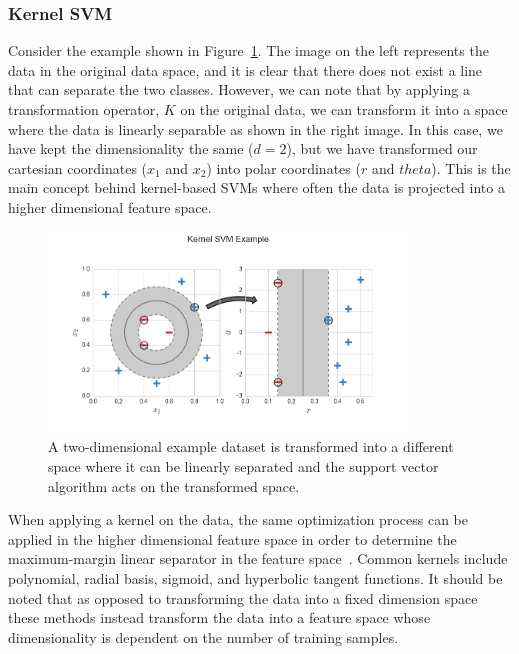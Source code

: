\subsubsection{Kernel SVM}

Consider the example shown in Figure~\ref{fig:kernelSvmExample}.
%
The image on the left represents the data in the original data space, and it is clear that there does not exist a line that can separate the two classes.
%
However, we can note that by applying a transformation operator, $K$ on the original data, we can transform it into a space where the data is linearly separable as shown in the right image.
%
In this case, we have kept the dimensionality the same ($d=2$), but we have transformed our cartesian coordinates ($x_1$ and $x_2$) into polar coordinates ($r$ and $theta$).
%
This is the main concept behind kernel-based SVMs where often the data is projected into a higher dimensional feature space.

\begin{figure}[!ht]
  \centering
  \includegraphics[width=0.85\textwidth]{figs/chap3/kernelSvmExample}
  \caption[Kernel Support Vector Machine Example]{A two-dimensional example dataset is transformed into a different space where it can be linearly separated and the support vector algorithm acts on the transformed space.}
  \label{fig:kernelSvmExample}
\end{figure}

When applying a kernel on the data, the same optimization process can be applied in the higher dimensional feature space in order to determine the maximum-margin linear separator in the feature space~\cite{BoserGuyonVapnik1992}.
%
Common kernels include polynomial, radial basis, sigmoid, and hyperbolic tangent functions.
%
It should be noted that as opposed to transforming the data into a fixed dimension space these methods instead transform the data into a feature space whose dimensionality is dependent on the number of training samples.

